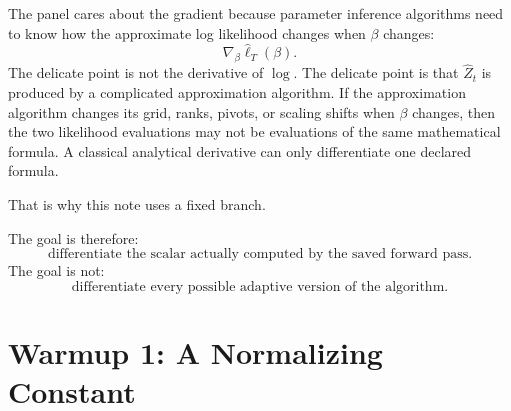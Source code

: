\documentclass[11pt]{article}
\newcommand{\widehatell}{\widehat\ell}
\begin{document}
The panel cares about the gradient because parameter inference algorithms need
to know how the approximate log likelihood changes when \(\beta\) changes:
\[
    \nabla_\beta \widehatell_T(\beta).
    \tag{P19-4}
\]
The delicate point is not the derivative of \(\log\).  The delicate point is
that \(\widehat Z_t\) is produced by a complicated approximation algorithm.  If
the approximation algorithm changes its grid, ranks, pivots, or scaling shifts
when \(\beta\) changes, then the two likelihood evaluations may not be
evaluations of the same mathematical formula.  A classical analytical
derivative can only differentiate one declared formula.

That is why this note uses a fixed branch.

\begin{center}
\end{center}

The goal is therefore:
\[
    \text{differentiate the scalar actually computed by the saved forward pass.}
    \tag{P19-5}
\]
The goal is not:
\[
    \text{differentiate every possible adaptive version of the algorithm.}
    \tag{P19-6}
\]

\section{Warmup 1: A Normalizing Constant}
\end{document}
